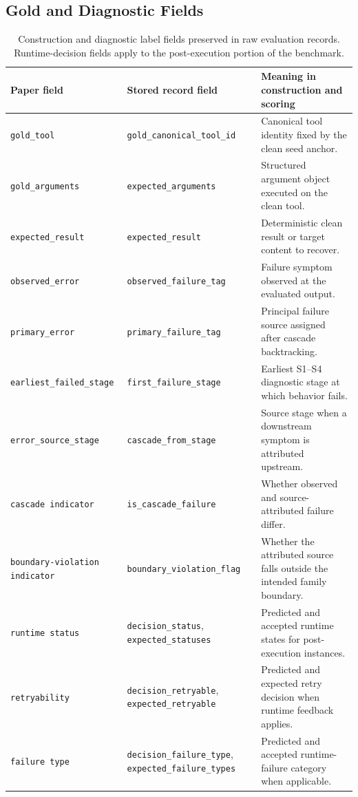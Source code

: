 \documentclass[11pt]{article}
\begin{document}
\subsection{Gold and Diagnostic Fields}

\begin{table}[htbp]
\centering
\scriptsize
\begin{tabularx}{\linewidth}{l l Y}
\toprule
Paper field & Stored record field & Meaning in construction and scoring \\
\midrule
\texttt{gold\_tool} & \texttt{gold\_canonical\_tool\_id} & Canonical tool identity fixed by the clean seed anchor. \\
\texttt{gold\_arguments} & \texttt{expected\_arguments} & Structured argument object executed on the clean tool. \\
\texttt{expected\_result} & \texttt{expected\_result} & Deterministic clean result or target content to recover. \\
\texttt{observed\_error} & \texttt{observed\_failure\_tag} & Failure symptom observed at the evaluated output. \\
\texttt{primary\_error} & \texttt{primary\_failure\_tag} & Principal failure source assigned after cascade backtracking. \\
\texttt{earliest\_failed\_stage} & \texttt{first\_failure\_stage} & Earliest S1--S4 diagnostic stage at which behavior fails. \\
\texttt{error\_source\_stage} & \texttt{cascade\_from\_stage} & Source stage when a downstream symptom is attributed upstream. \\
\texttt{cascade indicator} & \texttt{is\_cascade\_failure} & Whether observed and source-attributed failure differ. \\
\texttt{boundary-violation indicator} & \texttt{boundary\_violation\_flag} & Whether the attributed source falls outside the intended family boundary. \\
\texttt{runtime status} & \texttt{decision\_status}, \texttt{expected\_statuses} & Predicted and accepted runtime states for post-execution instances. \\
\texttt{retryability} & \texttt{decision\_retryable}, \texttt{expected\_retryable} & Predicted and expected retry decision when runtime feedback applies. \\
\texttt{failure type} & \texttt{decision\_failure\_type}, \texttt{expected\_failure\_types} & Predicted and accepted runtime-failure category when applicable. \\
\bottomrule
\end{tabularx}
\caption{Construction and diagnostic label fields preserved in raw evaluation records. Runtime-decision fields apply to the post-execution portion of the benchmark.}
\label{tab:construction-labels}
\end{table}
\end{document}
